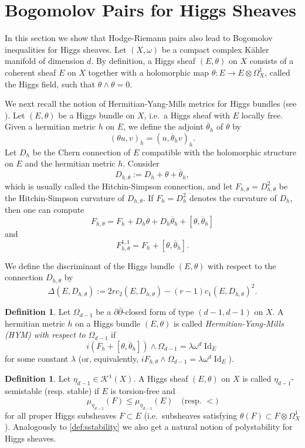 \documentclass[a4,reqno]{amsart}
\theoremstyle{definition}
\newtheorem{definition}[theorem]{Definition}
\def\cK{\mathcal K}
\DeclareMathOperator{\Id}{Id}
\numberwithin{equation}{section}
\begin{document}
\section{Bogomolov Pairs for Higgs Sheaves}

In this section we show that Hodge-Riemann pairs also lead to Bogomolov inequalities for Higgs sheaves. Let $(X,\omega)$ be a compact complex K\"ahler manifold of dimension $d$. By definition, a Higgs sheaf $(E,\theta)$ on $X$ consists of a coherent sheaf $E$ on $X$ together with a holomorphic map $\theta : E \to E \otimes \Omega^1_X$, called the Higgs field, such that $\theta \wedge \theta = 0$. 

We next recall the notion of Hermitian-Yang-Mills metrics for Higgs bundles (see \cite[Section 3]{Simpson-HiggsBundles}). Let $(E,\theta)$ be a Higgs bundle on $X$, i.e.\ a Higgs sheaf with $E$ locally free. Given a hermitian metric $h$ on $E$, we define the adjoint $\overline{\theta}_h$ of $\theta$ by
\[
    (\theta u,v)_h = (u,\overline{\theta}_hv)_h.
\]
Let $D_h$ be the Chern connection of $E$ compatible with the holomorphic structure on $E$ and the hermitian metric $h$. Consider
\[
    D_{h,\theta} := D_h + \theta + \overline{\theta}_h,
\]
which is usually called the Hitchin-Simpson connection, and let $F_{h,\theta} = D_{h,\theta}^2$ be the Hitchin-Simpson curvature of $D_{h,\theta}$. If $F_h = D_h^2$ denotes the curvature of $D_h$, then one can compute
\[
    F_{h,\theta} = F_h + D_h \theta + D_h\overline{\theta}_h + [\theta, \overline{\theta}_h]
\]
and
\[
    F_{h,\theta}^{1,1} = F_h + [\theta, \overline{\theta}_h].
\]

We define the discriminant of the Higgs bundle $(E,\theta)$ with respect to the connection $D_{h,\theta}$ by
\[
    \Delta(E,D_{h,\theta}) := 2r c_2(E,D_{h,\theta})  - (r-1) c_1(E,D_{h,\theta})^2.
\]

\begin{definition}\label{def:HYM-Higgs}
Let $\Omega_{d-1}$ be a $\partial \bar{\partial}$-closed form of type $(d-1,d-1)$ on $X$. A hermitian metric $h$ on a Higgs bundle $(E,\theta)$ is called \textit{Hermitian-Yang-Mills (HYM) with respect to $\Omega_{d-1}$} if
\[
    i(F_h + [\theta, \overline{\theta}_h])\wedge \Omega_{d-1} = \lambda \omega^d \Id_E
\]
for some constant $\lambda$ (or, equivalently, $iF_{h,\theta} \wedge \Omega_{d-1} = \lambda \omega^d \Id_E$).
\end{definition}

\begin{definition}
Let $\eta_{d-1} \in \cK^1(X)$. A Higgs sheaf $(E,\theta)$ on $X$ is called $\eta_{d-1}$-semistable (resp. stable) if $E$ is torsion-free and
\[
    \mu_{\eta_{d-1}}(F) \le \mu_{\eta_{d-1}}(E) \quad \text{(resp. }<)
\]
for all proper Higgs subsheaves $F \subset E$ (i.e.\ subsheaves satisfying $\theta(F) \subset F \otimes \Omega^1_X$). Analogously to \cref{def:sstability} we also get a natural notion of polystability for Higgs sheaves.
\end{definition}
\end{document}
